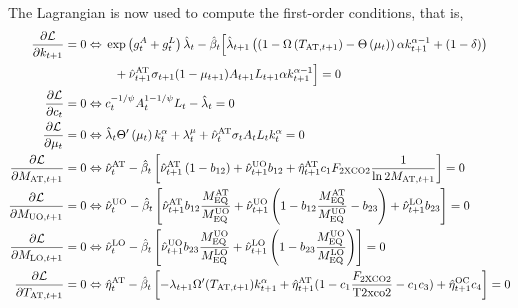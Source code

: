 \documentclass[11pt, a4paper, pdftex, twoside, dvipsnames]{article}
\begin{document}
\begin{appendices}
The Lagrangian is now used to compute the first-order conditions, that is,
%
\begin{align}
  \label{eq:CDICE_foc_kplus}
\nonumber \frac{\partial \mathcal{L}}{\partial k_{t+1}}=0
      \Leftrightarrow & \;
    \exp\left(g^{A}_{t}+g^{L}_{t}\right)\hat{\lambda}_t
    - \hat{\beta}_t \Bigl[\hat{\lambda}_{t+1} \left(\left(1 - \Omega\left(T_{\text{AT},t+1}\right)- \Theta\left(\mu_{t}\right)\right)
    \alpha k^{\alpha-1}_{t+1} + \left(1-\delta\right) \right) \\
& \quad + \hat{\nu}_{t+1}^{\text{AT}}
    \sigma_{t+1} (1-\mu_{t+1}) A_{t+1}L_{t+1} \alpha k^{\alpha-1}_{t+1} \Bigr] =0 \\
  \label{eq:CDICE_foc_cons}
  \frac{\partial \mathcal{L}}{\partial c_{t}}=0
      \Leftrightarrow & \; c_t^{-1/\psi}A_{t}^{1-1/\psi}L_{t}
             -\hat{\lambda}_t = 0\\
  \label{eq:CDICE_foc_mu}
\frac{\partial \mathcal{L}}{\partial \mu_{t}}=0
      \Leftrightarrow & \; \hat{\lambda}_t \Theta^{\prime}\left(\mu_{t}\right)k_t^{\alpha}  +
    \lambda_{t}^{\mu} + \hat{\nu}_t^{\text{AT}} \sigma_t A_{t}L_{t}k_{t}^{\alpha} = 0\\
  \label{eq:CDICE_foc_MAT}
\frac{\partial \mathcal{L}}{\partial M_{\text{AT},t+1}}=0
      \Leftrightarrow & \; \hat{\nu}_t^{\text{AT}} - \hat{\beta}_t \left[\hat{\nu}_{t+1}^{\text{AT}} \left(1 - b_{12}\right) + \hat{\nu}_{t+1}^{\text{UO}} b_{12} + \hat{\eta}_{t+1}^{\text{AT}} c_1 F_{\text{2XCO2}} \frac{1}{\ln2 M_{\text{AT},t+1}} \right] = 0 \\
%
\label{eq:CDICE_foc_MUO}
\frac{\partial \mathcal{L}}{\partial M_{\text{UO},t+1}}=0
      \Leftrightarrow & \; \hat{\nu}_t^{\text{UO}} - \hat{\beta}_t \left[\hat{\nu}_{t+1}^{\text{AT}} b_{12} \frac{M^{\text{AT}}_{\text{EQ}}}{M^{\text{UO}}_{\text{EQ}}} + \hat{\nu}_{t+1}^{\text{UO}} \left(1 - b_{12} \frac{M^{\text{AT}}_{\text{EQ}}}{M^{\text{UO}}_{\text{EQ}}} - b_{23}\right) + \hat{\nu}_{t+1}^{\text{LO}} b_{23} \right] = 0 \\
\label{eq:CDICE_foc_MLO}
\frac{\partial \mathcal{L}}{\partial M_{\text{LO},t+1}}=0
      \Leftrightarrow & \; \hat{\nu}_t^{\text{LO}} - \hat{\beta}_t \left[\hat{\nu}_{t+1}^{\text{UO}} b_{23} \frac{M^{\text{UO}}_{\text{EQ}}}{M^{\text{LO}}_{\text{EQ}}} + \hat{\nu}_{t+1}^{\text{LO}} \left(1 - b_{23} \frac{M^{\text{UO}}_{\text{EQ}}}{M^{\text{LO}}_{\text{EQ}}} \right) \right] = 0 \\
%
\label{eq:CDICE_foc_TAT}
\frac{\partial \mathcal{L}}{\partial T_{\text{AT},t+1}}=0
      \Leftrightarrow & \; \hat{\eta}_t^{\text{AT}} - \hat{\beta}_t \left[-\lambda_{t+1}  \Omega^{\prime}(T_{\text{AT},t+1}) k^{\alpha}_{t+1} + \hat{\eta}_{t+1}^{\text{AT}} (1-c_1\frac{F_{\text{2XCO2}}}{\text{T2xco2}} - c_1 c_3) + \hat{\eta}_{t+1}^{\text{OC}} c_{4}  \right] =0 \\

\end{align}
\end{appendices}
\end{document}

